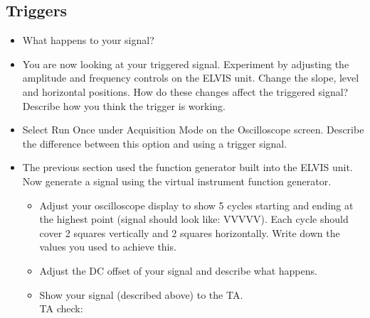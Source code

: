 \documentclass{article}
\begin{document}
\subsection*{Triggers}
\begin{itemize}
	\item What happens to your signal? \vspace{2cm}
	\item You are now looking at your triggered signal. Experiment by adjusting the amplitude and frequency controls on the ELVIS unit. Change the slope, level and horizontal positions. How do these changes affect the triggered signal? Describe how you think the trigger is working.\vspace{4cm}
	\item Select Run Once under Acquisition Mode on the Oscilloscope screen. Describe the difference between this option and using a trigger signal.\vspace{4cm}
	\item The previous section used the function generator built into the ELVIS unit. Now generate a signal using the virtual instrument function generator.
		\begin{itemize}
			\item Adjust your oscilloscope display to show 5 cycles starting and ending at the highest point (signal should look like: VVVVV). Each cycle should cover 2 squares vertically and 2 squares horizontally. Write down the values you used to achieve this.\vspace{5cm}
			\item Adjust the DC offset of your signal and describe what happens.
			\item Show your signal (described above) to the TA.\\TA check: \underline{\hspace{2cm}}
		\end{itemize}
\end{itemize}
\pagebreak
\end{document}
